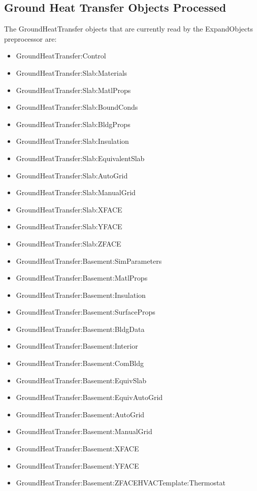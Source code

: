 \subsection{Ground Heat Transfer Objects Processed}\label{ground-heat-transfer-objects-processed}

The GroundHeatTransfer objects that are currently read by the ExpandObjects preprocessor are:

\begin{itemize}
\item
  GroundHeatTransfer:Control
\item
  GroundHeatTransfer:Slab:Materials
\item
  GroundHeatTransfer:Slab:MatlProps
\item
  GroundHeatTransfer:Slab:BoundConds
\item
  GroundHeatTransfer:Slab:BldgProps
\item
  GroundHeatTransfer:Slab:Insulation
\item
  GroundHeatTransfer:Slab:EquivalentSlab
\item
  GroundHeatTransfer:Slab:AutoGrid
\item
  GroundHeatTransfer:Slab:ManualGrid
\item
  GroundHeatTransfer:Slab:XFACE
\item
  GroundHeatTransfer:Slab:YFACE
\item
  GroundHeatTransfer:Slab:ZFACE
\item
  GroundHeatTransfer:Basement:SimParameters
\item
  GroundHeatTransfer:Basement:MatlProps
\item
  GroundHeatTransfer:Basement:Insulation
\item
  GroundHeatTransfer:Basement:SurfaceProps
\item
  GroundHeatTransfer:Basement:BldgData
\item
  GroundHeatTransfer:Basement:Interior
\item
  GroundHeatTransfer:Basement:ComBldg
\item
  GroundHeatTransfer:Basement:EquivSlab
\item
  GroundHeatTransfer:Basement:EquivAutoGrid
\item
  GroundHeatTransfer:Basement:AutoGrid
\item
  GroundHeatTransfer:Basement:ManualGrid
\item
  GroundHeatTransfer:Basement:XFACE
\item
  GroundHeatTransfer:Basement:YFACE
\item
  GroundHeatTransfer:Basement:ZFACEHVACTemplate:Thermostat
\end{itemize}
